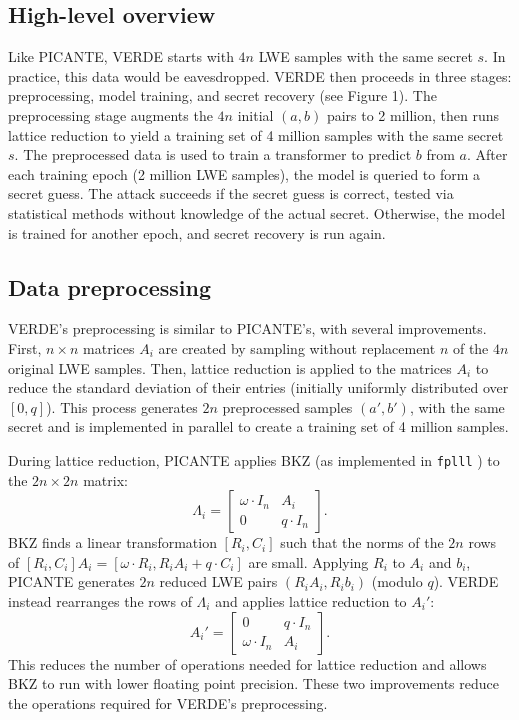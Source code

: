 \documentclass{article}
\begin{document}
\subsection{High-level overview}
Like PICANTE, VERDE starts with $4n$ LWE samples with the same secret $s$. In practice, this data would be eavesdropped. VERDE then proceeds in three stages: preprocessing, model training, and secret recovery (see Figure 1). The preprocessing stage augments the $4n$ initial $(a, b)$ pairs to 2 million, then runs lattice reduction to yield a training set of 4 million samples with the same secret $s$. The preprocessed data is used to train a transformer to predict $b$ from $a$. After each training epoch (2 million LWE samples), the model is queried to form a secret guess. The attack succeeds if the secret guess is correct, tested via statistical methods without knowledge of the actual secret. Otherwise, the model is trained for another epoch, and secret recovery is run again.

\subsection{Data preprocessing}
VERDE's preprocessing is similar to PICANTE's, with several improvements. First, $n \times n$ matrices $A_i$ are created by sampling without replacement $n$ of the $4n$ original LWE samples. Then, lattice reduction is applied to the matrices $A_i$ to reduce the standard deviation of their entries (initially uniformly distributed over $[0, q]$). This process generates $2n$ preprocessed samples $(a', b')$, with the same secret and is implemented in parallel to create a training set of 4 million samples.

During lattice reduction, PICANTE applies BKZ (as implemented in \texttt{fplll} \cite{27}) to the $2n \times 2n$ matrix:
\[
\Lambda_i = \begin{bmatrix}
\omega \cdot I_n & A_i \\
0 & q \cdot I_n
\end{bmatrix}.
\]
BKZ finds a linear transformation $[R_i, C_i]$ such that the norms of the $2n$ rows of $[R_i, C_i] A_i = [\omega \cdot R_i, R_i A_i + q \cdot C_i]$ are small. Applying $R_i$ to $A_i$ and $b_i$, PICANTE generates $2n$ reduced LWE pairs $(R_i A_i, R_i b_i)$ (modulo $q$). VERDE instead rearranges the rows of $\Lambda_i$ and applies lattice reduction to $A_i'$:
\[
A_i' = \begin{bmatrix}
0 & q \cdot I_n \\
\omega \cdot I_n & A_i
\end{bmatrix}.
\]
This reduces the number of operations needed for lattice reduction and allows BKZ to run with lower floating point precision. These two improvements reduce the operations required for VERDE's preprocessing.
\end{document}
